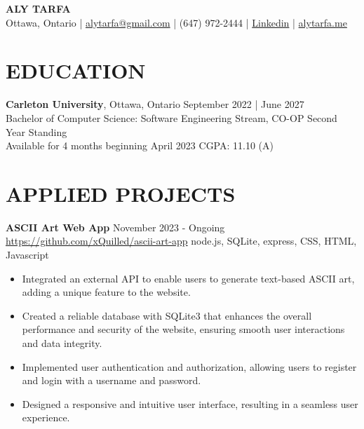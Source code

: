\documentclass[a4paper,10pt]{extarticle}
\begin{document}
\pagestyle{empty}

\begin{center}
	\textbf{\Large ALY TARFA}\\[2pt]
	Ottawa, Ontario | \href{mailto:alytarfa@gmail.com}{alytarfa@gmail.com} | (647) 972-2444 | \href{https://www.linkedin.com/in/aly-tarfa-b18b59225/}{Linkedin} | \href{https://alytarfa.me/}{alytarfa.me}
\end{center}

\section*{EDUCATION}
\noindent
\textbf{Carleton University}, Ottawa, Ontario \hfill September 2022 | June 2027\\
Bachelor of Computer Science: Software Engineering Stream, CO-OP \hfill Second Year Standing\\
Available for 4 months beginning April 2023 \hfill CGPA: 11.10 (A)

\section*{APPLIED PROJECTS}
\noindent
\textbf{ASCII Art Web App} \hfill November 2023 - Ongoing\\
\url{https://github.com/xQuilled/ascii-art-app} \hfill node.js, SQLite, express, CSS, HTML, Javascript
\begin{itemize}
	\item Integrated an external API to enable users to generate text-based ASCII art, adding a unique feature to the website.
	\item Created a reliable database with SQLite3 that enhances the overall performance and security of the website, ensuring smooth user interactions and data integrity.
	\item Implemented user authentication and authorization, allowing users to register and login with a username and password.
	\item Designed a responsive and intuitive user interface, resulting in a seamless user experience.
\end{itemize}
\end{document}
